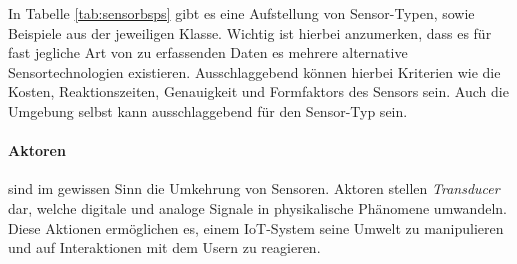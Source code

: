 \begin{table}[H]
\centering
\caption{Sensortypen und beispielhafte Vertreter. Obwohl sämtliche Sensoren analoge bzw. digitale Daten schicken, Sensoren können stark unterschiedliche Outputs besitzen. Tabelle angelehnt an \cite{lopez2011taxonomy}}
\label{tab:sensorbsps}
\end{table}

In Tabelle \ref{tab:sensorbsps} gibt es eine Aufstellung von Sensor-Typen, sowie Beispiele aus der jeweiligen Klasse. Wichtig ist hierbei anzumerken, dass es für fast jegliche Art von zu erfassenden Daten es mehrere alternative Sensortechnologien existieren. Ausschlaggebend können hierbei Kriterien wie die Kosten, Reaktionszeiten, Genauigkeit und Formfaktors des Sensors sein. Auch die Umgebung selbst kann ausschlaggebend für den Sensor-Typ sein.

\paragraph{Aktoren} sind im gewissen Sinn die Umkehrung von Sensoren. Aktoren stellen \textit{Transducer} dar, welche digitale und analoge Signale in physikalische Phänomene umwandeln. Diese Aktionen ermöglichen es, einem \ac{IoT}-System seine Umwelt zu manipulieren und auf Interaktionen mit dem Usern zu reagieren. 

